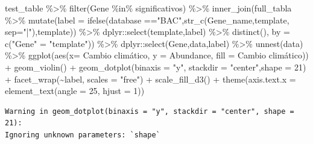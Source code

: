 \documentclass[
  letterpaper,
  DIV=11,
  numbers=noendperiod]{scrartcl}
\newenvironment{Shaded}{\begin{snugshade}}{\end{snugshade}}
\newcommand{\AttributeTok}[1]{\textcolor[rgb]{0.40,0.45,0.13}{#1}}
\newcommand{\DecValTok}[1]{\textcolor[rgb]{0.68,0.00,0.00}{#1}}
\newcommand{\FunctionTok}[1]{\textcolor[rgb]{0.28,0.35,0.67}{#1}}
\newcommand{\NormalTok}[1]{\textcolor[rgb]{0.00,0.23,0.31}{#1}}
\newcommand{\OtherTok}[1]{\textcolor[rgb]{0.00,0.23,0.31}{#1}}
\newcommand{\SpecialCharTok}[1]{\textcolor[rgb]{0.37,0.37,0.37}{#1}}
\newcommand{\StringTok}[1]{\textcolor[rgb]{0.13,0.47,0.30}{#1}}
\begin{document}
\begin{Shaded}
\begin{Highlighting}[]
\NormalTok{test\_table }\SpecialCharTok{\%\textgreater{}\%} 
  \FunctionTok{filter}\NormalTok{(Gene }\SpecialCharTok{\%in\%}\NormalTok{ significativos) }\SpecialCharTok{\%\textgreater{}\%} 
  \FunctionTok{inner\_join}\NormalTok{(full\_tabla }\SpecialCharTok{\%\textgreater{}\%} 
               \FunctionTok{mutate}\NormalTok{(}\AttributeTok{label =} \FunctionTok{ifelse}\NormalTok{(database }\SpecialCharTok{==}\StringTok{"BAC"}\NormalTok{,}\FunctionTok{str\_c}\NormalTok{(Gene\_name,template, }\AttributeTok{sep=}\StringTok{"|"}\NormalTok{),template)) }\SpecialCharTok{\%\textgreater{}\%}\NormalTok{ dplyr}\SpecialCharTok{::}\FunctionTok{select}\NormalTok{(template,label) }\SpecialCharTok{\%\textgreater{}\%} \FunctionTok{distinct}\NormalTok{(), }\AttributeTok{by =} \FunctionTok{c}\NormalTok{(}\StringTok{"Gene"} \OtherTok{=} \StringTok{"template"}\NormalTok{)) }\SpecialCharTok{\%\textgreater{}\%} 
\NormalTok{  dplyr}\SpecialCharTok{::}\FunctionTok{select}\NormalTok{(Gene,data,label) }\SpecialCharTok{\%\textgreater{}\%} 
  \FunctionTok{unnest}\NormalTok{(data) }\SpecialCharTok{\%\textgreater{}\%} 
  \FunctionTok{ggplot}\NormalTok{(}\FunctionTok{aes}\NormalTok{(}\AttributeTok{x=} \StringTok{\textasciigrave{}}\AttributeTok{Cambio climático}\StringTok{\textasciigrave{}}\NormalTok{, }\AttributeTok{y =}\NormalTok{ Abundance, }\AttributeTok{fill =} \StringTok{\textasciigrave{}}\AttributeTok{Cambio climático}\StringTok{\textasciigrave{}}\NormalTok{)) }\SpecialCharTok{+} 
  \FunctionTok{geom\_violin}\NormalTok{() }\SpecialCharTok{+}
  \FunctionTok{geom\_dotplot}\NormalTok{(}\AttributeTok{binaxis =} \StringTok{"y"}\NormalTok{, }\AttributeTok{stackdir =} \StringTok{"center"}\NormalTok{,}\AttributeTok{shape =} \DecValTok{21}\NormalTok{) }\SpecialCharTok{+}
  \FunctionTok{facet\_wrap}\NormalTok{(}\SpecialCharTok{\textasciitilde{}}\NormalTok{label, }\AttributeTok{scales =} \StringTok{"free"}\NormalTok{) }\SpecialCharTok{+}
  \FunctionTok{scale\_fill\_d3}\NormalTok{() }\SpecialCharTok{+} 
  \FunctionTok{theme}\NormalTok{(}\AttributeTok{axis.text.x =} \FunctionTok{element\_text}\NormalTok{(}\AttributeTok{angle =} \DecValTok{25}\NormalTok{, }\AttributeTok{hjust =} \DecValTok{1}\NormalTok{))}
\end{Highlighting}
\end{Shaded}

\begin{verbatim}
Warning in geom_dotplot(binaxis = "y", stackdir = "center", shape = 21):
Ignoring unknown parameters: `shape`
\end{verbatim}
\end{document}
